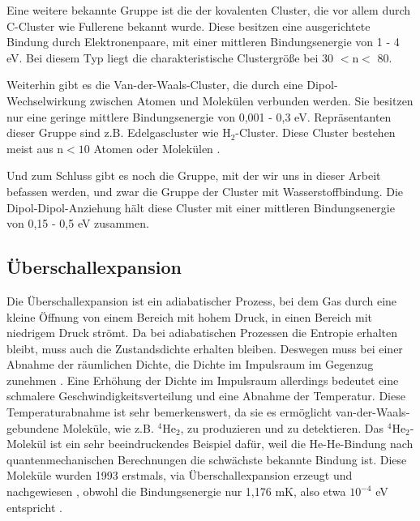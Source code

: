 Eine weitere bekannte Gruppe ist die der kovalenten Cluster, die vor allem durch C-Cluster wie Fullerene bekannt wurde. Diese besitzen eine ausgerichtete Bindung durch Elektronenpaare, mit einer mittleren Bindungsenergie von 1 - 4 eV. Bei diesem Typ liegt die charakteristische Clustergröße bei 30 $\mathrm{< n <}$ 80.

Weiterhin gibt es die Van-der-Waals-Cluster, die durch eine Dipol-Wechselwirkung zwischen Atomen und Molekülen verbunden werden. Sie besitzen nur eine geringe mittlere Bindungsenergie von 0,001 - 0,3 eV. Repräsentanten dieser Gruppe sind z.B. Edelgascluster wie $\mathrm{H}_2$-Cluster. Diese Cluster bestehen meist aus $\mathrm{n < 10}$ Atomen oder Molekülen .

Und zum Schluss gibt es noch die Gruppe, mit der wir uns in dieser Arbeit befassen werden, und zwar die Gruppe der Cluster mit Wasserstoffbindung. Die Dipol-Dipol-Anziehung hält diese Cluster mit einer mittleren Bindungsenergie von 0,15 - 0,5 eV zusammen. \\


\subsection{Überschallexpansion}

Die Überschallexpansion ist ein adiabatischer Prozess, bei dem Gas durch eine kleine Öffnung von einem Bereich mit hohem Druck, in einen Bereich mit niedrigem Druck strömt. Da bei adiabatischen Prozessen die Entropie erhalten bleibt, muss auch die Zustandsdichte erhalten bleiben. Deswegen muss bei einer Abnahme der räumlichen Dichte, die Dichte im Impulsraum im Gegenzug zunehmen \cite{kurka07}. Eine Erhöhung der Dichte im Impulsraum allerdings bedeutet eine schmalere Geschwindigkeitsverteilung und eine Abnahme der Temperatur. Diese Temperaturabnahme ist sehr bemerkenswert, da sie es ermöglicht van-der-Waals-gebundene Moleküle, wie z.B. $\mathrm{^4}\mathrm{He}_2$, zu produzieren und zu detektieren. Das $\mathrm{^4}\mathrm{He}_2$-Molekül ist ein sehr beeindruckendes Beispiel dafür, weil die He-He-Bindung nach quantenmechanischen Berechnungen die schwächste bekannte Bindung ist. Diese Moleküle wurden 1993 erstmals, via Überschallexpansion erzeugt und nachgewiesen \cite{Luo1993}, obwohl die Bindungsenergie  nur 1,176 mK, also etwa $\mathrm{10^{-4}}$ eV entspricht \cite{Lohr2007}. 


